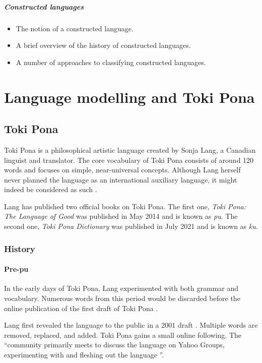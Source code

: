 \documentclass[14pt, a4paper]{extreport}
\begin{document}
\paragraph{Constructed languages}

\begin{itemize}
  \item The notion of a constructed language.
  \item A brief overview of the history of constructed languages.
  \item A number of approaches to classifying constructed languages.
\end{itemize}


\chapter{Language modelling and Toki Pona}
  \section{Toki Pona}
Toki Pona is a philosophical artistic language created by Sonja Lang, a Canadian linguist and translator. The core vocabulary of Toki Pona consists of around 120 words and focuses on simple, near-universal concepts. Although Lang herself never planned the language as an international auxiliary language, it might indeed be considered as such \parencite[100]{stria}.

Lang has published two official books on Toki Pona. The first one, \textit{Toki Pona: The Language of Good} was published in May 2014 and is known as \textit{pu}. The second one, \textit{Toki Pona Dictionary} was published in July 2021 and is known as \textit{ku}.
    \subsection{History}
      \subsubsection{Pre-pu}
In the early days of Toki Pona, Lang experimented with both grammar and vocabulary. Numerous words from this period would be discarded before the online publication of the first draft of Toki Pona \parencite{evo}.

Lang first revealed the language to the public in a 2001 draft \parencite{firstdraft}. Multiple words are removed, replaced, and added. Toki Pona gains a small online following. The ``community primarily meets to discuss the language on Yahoo Groups, experimenting with and fleshing out the language \parencite{evo}''.
\end{document}
